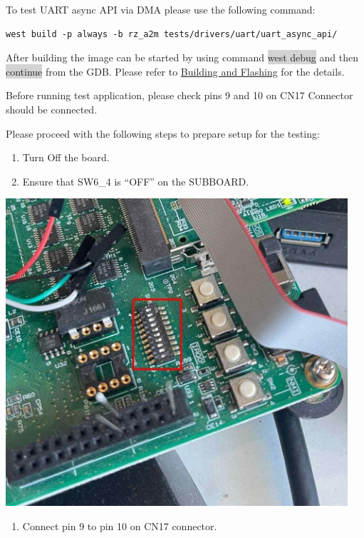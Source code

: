 \documentclass[11pt,a4paper,oneside]{article}
\begin{document}
To test UART async API via DMA please use the following command:

\begin{lstlisting}
west build -p always -b rz_a2m tests/drivers/uart/uart_async_api/
\end{lstlisting}

After building the image can be started by using command \colorbox{lightgray}{west debug}
and then \colorbox{lightgray}{continue} from the GDB. Please refer to
\hyperref[building-and-flashing]{Building and Flashing} for
the details.

Before running test application, please check pins 9 and 10 on CN17 Connector should be connected.

Please proceed with the following steps to prepare setup for the
testing:

\begin{enumerate}
\def\labelenumi{\arabic{enumi})}
\item
  Turn Off the board.
\item
  Ensure that SW6\_4 is ``OFF'' on the SUBBOARD.
\end{enumerate}

\includegraphics[width=5in,height=4.48958in]{./media/image3.jpg}

\begin{enumerate}
\def\labelenumi{\arabic{enumi})}
\setcounter{enumi}{2}
\item
  Connect pin 9 to pin 10 on CN17 connector.
\end{enumerate}
\end{document}

